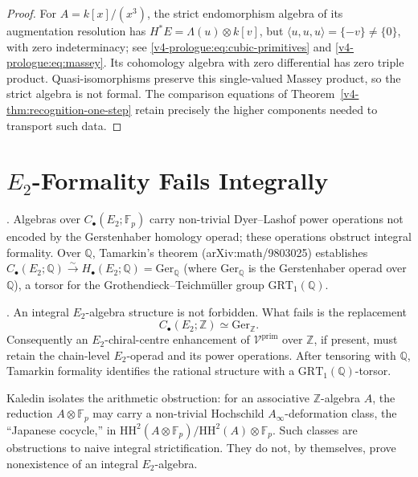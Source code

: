 \begin{proof}
For \(A=k[x]/(x^3)\), the strict endomorphism algebra of its
augmentation resolution has
\(H^*E=\Lambda(u)\otimes k[v]\), but
\(\langle u,u,u\rangle=\{-v\}\ne\{0\}\), with zero
indeterminacy; see \eqref{v4-prologue:eq:cubic-primitives} and
\eqref{v4-prologue:eq:massey}. Its cohomology algebra with zero
differential has zero triple product. Quasi-isomorphisms preserve
this single-valued Massey product, so the strict algebra is not
formal. The comparison equations of
Theorem~\ref{v4-thm:recognition-one-step} retain precisely the
higher components needed to transport such data.
\end{proof}

\section{\(E_{2}\)-Formality Fails Integrally}
\label{v4-arith:ks:E2-fails}

\begin{theorem}
\label{v4-arith:thm:E2-fails-integrally}
\ClaimStatusProvedElsewhere. Algebras over
\(C_{\bullet}(E_{2};\mathbb{F}_{p})\) carry non-trivial
Dyer--Lashof power operations not encoded by the Gerstenhaber
homology operad; these operations obstruct integral formality. Over
\(\mathbb{Q}\), Tamarkin's
theorem (arXiv:math/9803025) establishes
\(C_{\bullet}(E_{2};\mathbb{Q})\xrightarrow{\sim}H_{\bullet}(E_{2};\mathbb{Q})=\mathrm{Ger}_{\mathbb{Q}}\)
(where \(\mathrm{Ger}_{\mathbb{Q}}\) is the Gerstenhaber operad over \(\mathbb{Q}\)),
a torsor for the Grothendieck--Teichm\"{u}ller group
\(\mathrm{GRT}_{1}(\mathbb{Q})\).
\end{theorem}

\begin{corollary}
\label{v4-arith:cor:no-integral-E2}
\ClaimStatusProvedHere. An integral \(E_{2}\)-algebra structure is not
forbidden. What fails is the replacement
\[
C_{\bullet}(E_{2};\mathbb Z)\simeq \mathrm{Ger}_{\mathbb Z}.
\]
Consequently an \(E_{2}\)-chiral-centre enhancement of
\(\mathcal{V}^{\mathrm{prim}}\) over \(\mathbb Z\), if present, must
retain the chain-level \(E_{2}\)-operad and its power operations. After
tensoring with \(\mathbb Q\), Tamarkin formality identifies the
rational structure with a \(\mathrm{GRT}_{1}(\mathbb Q)\)-torsor.
\end{corollary}

\begin{remark}
Kaledin isolates the arithmetic obstruction: for
an associative \(\mathbb{Z}\)-algebra \(A\), the reduction
\(A\otimes\mathbb{F}_{p}\) may carry a non-trivial Hochschild
\(A_{\infty}\)-deformation class, the ``Japanese cocycle,'' in
\(\mathrm{HH}^{2}(A\otimes\mathbb{F}_{p})/\mathrm{HH}^{2}(A)\otimes\mathbb{F}_{p}\).
Such classes are obstructions to naive integral strictification. They
do not, by themselves, prove nonexistence of an integral
\(E_{2}\)-algebra.
\end{remark}

